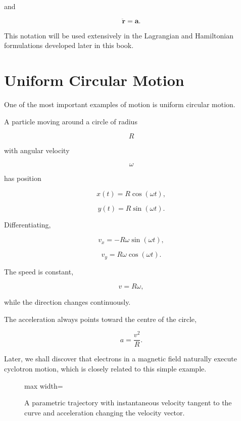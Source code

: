 \documentclass[11pt,a4paper,openany]{book}
\newcounter{example}[chapter]
\newenvironment{bookfigure}[2][tbp]{%
  \def\bookfigurecaption{#2}%
  \begin{figure}[#1]
  \centering
  \begin{adjustbox}{max width=\textwidth}
}{%
  \end{adjustbox}
  \caption{\bookfigurecaption}
  \end{figure}
}
\begin{document}
and

\[
\boxed{
	\ddot{\mathbf r}
	=
	\mathbf a.
}
\]

This notation will be used extensively in the Lagrangian and Hamiltonian
formulations developed later in this book.


\section{Uniform Circular Motion}

One of the most important examples of motion is uniform circular motion.

A particle moving around a circle of radius

\[
R
\]

with angular velocity

\[
\omega
\]

has position

\[
x(t)=R\cos(\omega t),
\]

\[
y(t)=R\sin(\omega t).
\]

Differentiating,

\[
v_x
=
-R\omega\sin(\omega t),
\]

\[
v_y
=
R\omega\cos(\omega t).
\]

The speed is constant,

\[
v
=
R\omega,
\]

while the direction changes continuously.

The acceleration always points toward the centre of the circle,

\[
\boxed{
	a
	=
	\frac{v^2}{R}.
}
\]

Later, we shall discover that electrons in a magnetic field naturally execute
cyclotron motion, which is closely related to this simple example.



\begin{bookfigure}{A parametric trajectory with instantaneous velocity tangent
to the curve and acceleration changing the velocity vector.}
\end{bookfigure}
\end{document}
